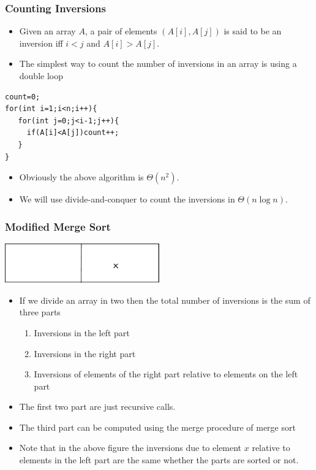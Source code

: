 \documentclass{beamer}
\begin{document}
\begin{frame}[fragile]

\frametitle{Counting Inversions}
  \begin{itemize}
  \item Given an array $A$, a pair of elements $(A[i],A[j])$ is said to be an inversion iff $i<j$ and $A[i]>A[j]$.
  \item The simplest way to count the number of inversions in an array is using a double loop
  \end{itemize}
\begin{lstlisting}
count=0;
for(int i=1;i<n;i++){
   for(int j=0;j<i-1;j++){
     if(A[i]<A[j])count++;
   }
}
\end{lstlisting}
  \begin{itemize}
  \item Obviously the above algorithm is $\Theta(n^2)$.
  \item We will use divide-and-conquer to count the inversions in $\Theta(n\log n)$.
  \end{itemize}
\end{frame}
\begin{frame}
  \frametitle{Modified Merge Sort}
  \begin{center}
\includegraphics[width=0.5\textwidth]{divide-figs/inversions}    
  \end{center}

  \begin{itemize}
  \item If we divide an array in two then the total number of inversions is the sum of three parts
    \begin{enumerate}
    \item Inversions in the left part
    \item Inversions in the right part
    \item Inversions of elements of the right part relative to elements on the left part
    \end{enumerate}
\item The first two part are just recursive calls.
\item The third part can be computed using the merge procedure of merge sort
\item Note that in the above figure the inversions due to element $x$ relative to elements in the left part are the same whether the parts are sorted or not.
\end{itemize}
\end{frame}
\end{document}
